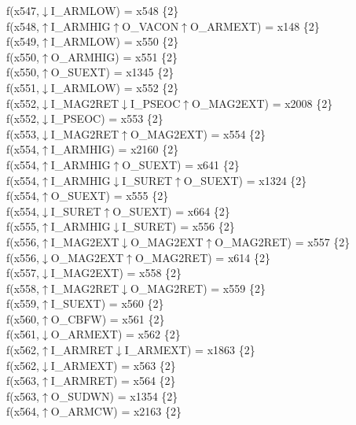 f(x547,$\downarrow$I\_ARMLOW) = x548 \{2\} \\  
f(x548,$\uparrow$I\_ARMHIG$\uparrow$O\_VACON$\uparrow$O\_ARMEXT) = x148 \{2\} \\  
f(x549,$\uparrow$I\_ARMLOW) = x550 \{2\} \\  
f(x550,$\uparrow$O\_ARMHIG) = x551 \{2\} \\  
f(x550,$\uparrow$O\_SUEXT) = x1345 \{2\} \\  
f(x551,$\downarrow$I\_ARMLOW) = x552 \{2\} \\  
f(x552,$\downarrow$I\_MAG2RET$\downarrow$I\_PSEOC$\uparrow$O\_MAG2EXT) = x2008 \{2\} \\  
f(x552,$\downarrow$I\_PSEOC) = x553 \{2\} \\  
f(x553,$\downarrow$I\_MAG2RET$\uparrow$O\_MAG2EXT) = x554 \{2\} \\  
f(x554,$\uparrow$I\_ARMHIG) = x2160 \{2\} \\  
f(x554,$\uparrow$I\_ARMHIG$\uparrow$O\_SUEXT) = x641 \{2\} \\  
f(x554,$\uparrow$I\_ARMHIG$\downarrow$I\_SURET$\uparrow$O\_SUEXT) = x1324 \{2\} \\  
f(x554,$\uparrow$O\_SUEXT) = x555 \{2\} \\  
f(x554,$\downarrow$I\_SURET$\uparrow$O\_SUEXT) = x664 \{2\} \\  
f(x555,$\uparrow$I\_ARMHIG$\downarrow$I\_SURET) = x556 \{2\} \\  
f(x556,$\uparrow$I\_MAG2EXT$\downarrow$O\_MAG2EXT$\uparrow$O\_MAG2RET) = x557 \{2\} \\  
f(x556,$\downarrow$O\_MAG2EXT$\uparrow$O\_MAG2RET) = x614 \{2\} \\  
f(x557,$\downarrow$I\_MAG2EXT) = x558 \{2\} \\  
f(x558,$\uparrow$I\_MAG2RET$\downarrow$O\_MAG2RET) = x559 \{2\} \\  
f(x559,$\uparrow$I\_SUEXT) = x560 \{2\} \\  
f(x560,$\uparrow$O\_CBFW) = x561 \{2\} \\  
f(x561,$\downarrow$O\_ARMEXT) = x562 \{2\} \\  
f(x562,$\uparrow$I\_ARMRET$\downarrow$I\_ARMEXT) = x1863 \{2\} \\  
f(x562,$\downarrow$I\_ARMEXT) = x563 \{2\} \\  
f(x563,$\uparrow$I\_ARMRET) = x564 \{2\} \\  
f(x563,$\uparrow$O\_SUDWN) = x1354 \{2\} \\  
f(x564,$\uparrow$O\_ARMCW) = x2163 \{2\} \\  

